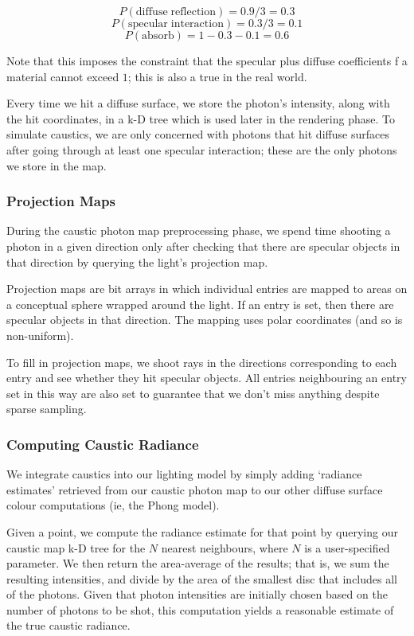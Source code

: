 \documentclass{article}
\newcommand{\mrm}[1]{\mathrm{#1}}
\begin{document}
$$P(\mrm{diffuse\; reflection}) = 0.9 / 3 = 0.3$$
$$P(\mrm{specular\; interaction}) = 0.3 / 3 = 0.1$$
$$P(\mrm{absorb}) = 1 - 0.3 - 0.1 = 0.6$$

Note that this imposes the constraint that the specular plus diffuse coefficients
f a material cannot exceed $1$; this is also a true in the real world.

Every time we hit a diffuse surface, we store the photon's intensity, along with
the hit coordinates, in a k-D tree which is used later in the rendering phase.
To simulate caustics, we are only concerned with photons that hit diffuse
surfaces after going through at least one specular interaction; these are the
only photons we store in the map.


\subsubsection{Projection Maps}

During the caustic photon map preprocessing phase, we spend time shooting a
photon in a given direction only after checking that there are specular objects
in that direction by querying the light's projection map.

Projection maps are bit arrays in which individual entries are mapped to areas on
a conceptual sphere wrapped around the light. If an entry is set, then there are
specular objects in that direction. The mapping uses polar coordinates (and so
is non-uniform).

To fill in projection maps, we shoot rays in the directions corresponding
to each entry and see whether they hit specular objects. All entries
neighbouring an entry set in this way are also set to guarantee that we don't
miss anything despite sparse sampling.


\subsubsection{Computing Caustic Radiance}

We integrate caustics into our lighting model by simply adding `radiance
estimates' retrieved from our caustic photon map to our other diffuse surface
colour computations (ie, the Phong model).

Given a point, we compute the radiance estimate for that point by querying our
caustic map k-D tree for the $N$ nearest neighbours, where $N$ is a
user-specified parameter. We then return the area-average of the results; that
is, we sum the resulting intensities, and divide by the area
of the smallest disc that includes all of the photons. Given that photon
intensities are initially chosen based on the number of photons to be shot, this
computation yields a reasonable estimate of the true caustic radiance.
\end{document}

